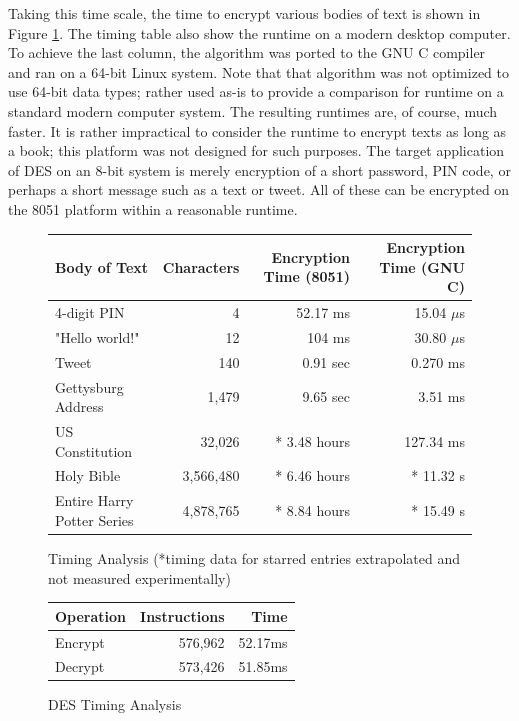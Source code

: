 \documentclass[conference]{IEEEtran}
\begin{document}
Taking this time scale, the time to encrypt various bodies of text is shown in Figure  \ref{fig:timing_table}. The timing table also show the runtime on a modern desktop computer. To achieve the last column, the algorithm was ported to the GNU C compiler and ran on a 64-bit Linux system. Note that that algorithm was not optimized to use 64-bit data types; rather used as-is to provide a comparison for runtime on a standard modern computer system. The resulting runtimes are, of course, much faster. It is rather impractical to consider the runtime to encrypt texts as long as a book; this platform was not designed for such purposes. The target application of DES on an 8-bit system is merely encryption of a short password, PIN code, or perhaps a short message such as a text or tweet. All of these can be encrypted on the 8051 platform within a reasonable runtime.

\begin{figure}[ht]
  \centering
\begin{tabular}{ | l r r r | }
  \hline
  Body of Text & Characters & Encryption Time (8051) & Encryption Time (GNU C) \\ 
  \hline\hline
  4-digit PIN & 4 & 52.17 ms & 15.04 $\mu$s \\
  "Hello world!" & 12 & 104 ms & 30.80 $\mu$s \\  
  Tweet & 140 & 0.91 sec & 0.270 ms \\
  Gettysburg Address & 1,479 & 9.65 sec & 3.51 ms \\
  US Constitution & 32,026 & \** 3.48 hours & 127.34 ms\\
  Holy Bible  & 3,566,480 & \** 6.46 hours & \** 11.32 s \\
  Entire Harry Potter Series  & 4,878,765 & \** 8.84 hours & \** 15.49 s \\
  \hline
\end{tabular}
  \caption{Timing Analysis (\**timing data for starred entries extrapolated and not measured experimentally) }
  \label{fig:timing_table}
\end{figure}

\begin{figure}[ht]
  \centering
\begin{tabular}{ | l r r | }
  \hline
  Operation & Instructions & Time \\ 
  \hline\hline
  Encrypt & 576,962 & 52.17ms \\  
  Decrypt & 573,426 & 51.85ms \\    
  \hline
\end{tabular}
  \caption{DES Timing Analysis}
  \label{fig:timing}
\end{figure}
\end{document}
